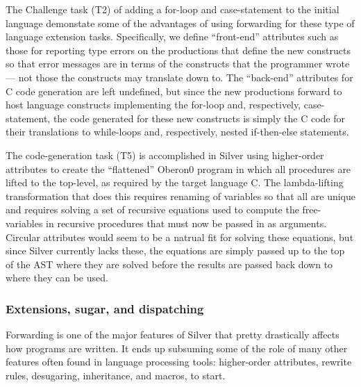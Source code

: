 The Challenge task (T2) of adding a for-loop and case-statement to the
initial language demonstate some of the advantages of using forwarding
for these type of language extension tasks.  Specifically, we define
``front-end'' attributes such as those for reporting type errors on
the productions that define the new constructs so that error messages
are in terms of the constructs that the programmer wrote --- not those
the constructs may translate down to.  The ``back-end'' attributes for
C code generation are left undefined, but since the new productions
forward to host language constructs implementing the for-loop and,
respectively, case-statement, the code generated for these new
constructs is simply the C code for their translations to while-loops
and, respectively, nested if-then-else statements.


The code-generation task (T5) is accomplished in Silver using
higher-order attributes to create the ``flattened'' Oberon0 program in
which all procedures are lifted to the top-level, as required by the
target language C.  The lambda-lifting transformation that does this
requires renaming of variables so that all are unique and requires
solving a set of recursive equations used to compute the
free-variables in recursive procedures that must now be passed in as
arguments.  Circular attributes would seem to be a natrual fit for
solving these equations, but since Silver currently lacks these, the
equations are simply passed up to the top of the AST where they are
solved before the results are passed back down to where they can be
used.

\subsubsection{Extensions, sugar, and dispatching}

Forwarding is one of the major features of Silver that pretty drastically
affects how programs are written.
%
It ends up subsuming some of the role of many other features often found in
language processing tools: higher-order attributes, rewrite rules, desugaring,
inheritance, and macros, to start.

